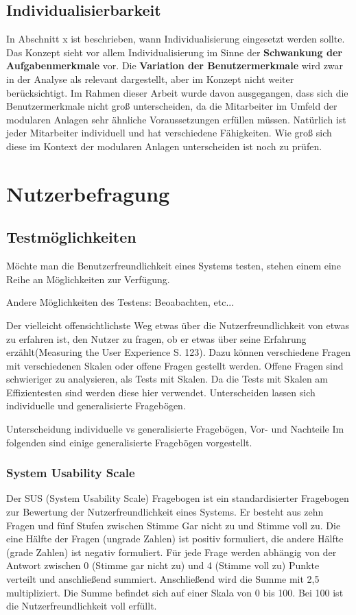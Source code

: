 \subsection*{Individualisierbarkeit}
In Abschnitt x ist beschrieben, wann Individualisierung eingesetzt werden sollte. Das Konzept sieht vor allem Individualisierung im Sinne der \textbf{Schwankung der Aufgabenmerkmale} vor. Die \textbf{Variation der Benutzermerkmale} wird zwar in der Analyse als relevant dargestellt, aber im Konzept nicht weiter berücksichtigt. Im Rahmen dieser Arbeit wurde davon ausgegangen, dass sich die Benutzermerkmale nicht groß unterscheiden, da die Mitarbeiter im Umfeld der modularen Anlagen sehr ähnliche Voraussetzungen erfüllen müssen. Natürlich ist jeder Mitarbeiter individuell und hat verschiedene Fähigkeiten. Wie groß sich diese im Kontext der modularen Anlagen unterscheiden ist noch zu prüfen. 

\section{Nutzerbefragung}


\subsection{Testmöglichkeiten}
Möchte man die Benutzerfreundlichkeit eines Systems testen, stehen einem eine Reihe an Möglichkeiten zur Verfügung. 

Andere Möglichkeiten des Testens: Beoabachten, etc...

\glqq Der vielleicht offensichtlichste Weg etwas über die Nutzerfreundlichkeit von etwas zu erfahren ist, den Nutzer zu fragen, ob er etwas über seine Erfahrung erzählt\grqq(Measuring the User Experience S. 123). Dazu können verschiedene Fragen mit verschiedenen Skalen oder offene Fragen gestellt werden. Offene Fragen sind schwieriger zu analysieren, als Tests mit Skalen. Da die Tests mit Skalen am Effizientesten sind werden diese hier verwendet. Unterscheiden lassen sich individuelle und generalisierte Fragebögen.

Unterscheidung individuelle vs generalisierte Fragebögen, Vor- und Nachteile
Im folgenden sind einige generalisierte Fragebögen vorgestellt.

\subsubsection*{System Usability Scale}
Der SUS (System Usability Scale) Fragebogen ist ein standardisierter Fragebogen zur Bewertung der Nutzerfreundlichkeit eines Systems. Er besteht aus zehn Fragen und fünf Stufen zwischen Stimme Gar nicht zu und Stimme voll zu. Die eine Hälfte der Fragen (ungrade Zahlen) ist positiv formuliert, die andere Hälfte (grade Zahlen) ist negativ formuliert. Für jede Frage werden abhängig von der Antwort zwischen 0 (Stimme gar nicht zu) und 4 (Stimme voll zu) Punkte verteilt und anschließend summiert. Anschließend wird die Summe mit 2,5 multipliziert. Die Summe befindet sich auf einer Skala von 0 bis 100. Bei 100 ist die Nutzerfreundlichkeit voll erfüllt. 

